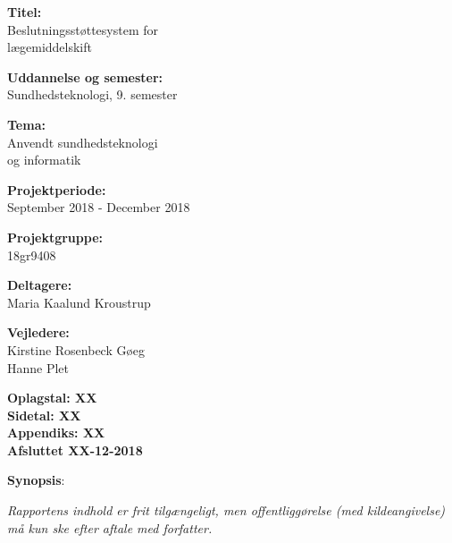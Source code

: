 \begin{minipage}[t]{0.48\textwidth}
\textbf{Titel:} \\[5pt]\bigskip\hspace{2ex}
Beslutningsstøttesystem for \\ \bigskip\hspace{2ex} lægemiddelskift

\textbf{Uddannelse og semester:} \\[5pt]\bigskip\hspace{2ex}
Sundhedsteknologi, 9. semester

\textbf{Tema:} \\[5pt]\bigskip\hspace{2ex}
Anvendt sundhedsteknologi \\ \bigskip\hspace{2ex}
og informatik

\vspace*{2mm}

\textbf{Projektperiode:} \\[5pt]\bigskip\hspace{2ex}
September 2018 - December 2018

\textbf{Projektgruppe:} \\[5pt]\bigskip\hspace{2ex}
18gr9408

\textbf{Deltagere:} \\[5pt]\hspace*{2ex}
Maria Kaalund Kroustrup

\vspace*{5mm}

\textbf{Vejledere:} \\[5pt]\hspace*{2ex}
Kirstine Rosenbeck Gøeg \\\bigskip\hspace{2ex}
Hanne Plet

\vspace*{1cm}

\textbf{Oplagstal: XX} \\
\textbf{Sidetal: XX} \\
\textbf{Appendiks: XX} \\ 
\textbf{Afsluttet XX-12-2018}

\end{minipage}
\hfill
\begin{minipage}[t]{0.483\textwidth}
\textbf{Synopsis}: \\[5pt]
\fbox{\parbox{7cm}{\bigskip\bigskip}}
\end{minipage}

\vfill

{\footnotesize\itshape Rapportens indhold er frit tilgængeligt, men offentliggørelse (med kildeangivelse) må kun ske efter aftale med forfatter.}

